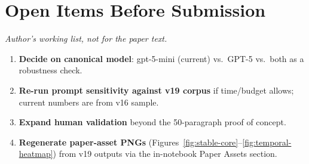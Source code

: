 \documentclass[11pt, a4paper]{article}
\begin{document}
\section*{Open Items Before Submission}

\noindent\textit{Author's working list, not for the paper text.}

\begin{enumerate}
\item \textbf{Decide on canonical model}: gpt-5-mini (current) vs.\ GPT-5
      vs.\ both as a robustness check.
\item \textbf{Re-run prompt sensitivity against v19 corpus} if
      time/budget allows; current numbers are from v16 sample.
\item \textbf{Expand human validation} beyond the 50-paragraph proof of
      concept.
\item \textbf{Regenerate paper-asset PNGs} (Figures~\ref{fig:stable-core}--\ref{fig:temporal-heatmap})
      from v19 outputs via the in-notebook Paper Assets section.
\end{enumerate}
\end{document}
